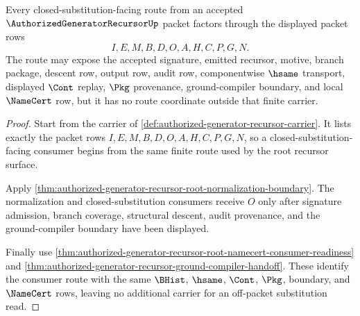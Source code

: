 \begin{theorem}
\label{thm:authorized-generator-recursor-root-carrier-route}
Every closed-substitution-facing route from an accepted $\AuthorizedGeneratorRecursorUp$ packet factors through the displayed packet rows
$$
I,E,M,B,D,O,A,H,C,P,G,N.
$$
The route may expose the accepted signature, emitted recursor, motive, branch package, descent row, output row, audit row, componentwise $\hsame$ transport, displayed $\Cont$ replay, $\Pkg$ provenance, ground-compiler boundary, and local $\NameCert$ row, but it has no route coordinate outside that finite carrier.
\end{theorem}
\begin{proof}
Start from the carrier of \autoref{def:authorized-generator-recursor-carrier}. It lists exactly the packet rows $I,E,M,B,D,O,A,H,C,P,G,N$, so a closed-substitution-facing consumer begins from the same finite route used by the root recursor surface.

Apply \autoref{thm:authorized-generator-recursor-root-normalization-boundary}. The normalization and closed-substitution consumers receive $O$ only after signature admission, branch coverage, structural descent, audit provenance, and the ground-compiler boundary have been displayed.

Finally use \autoref{thm:authorized-generator-recursor-root-namecert-consumer-readiness} and \autoref{thm:authorized-generator-recursor-ground-compiler-handoff}. These identify the consumer route with the same $\BHist$, $\hsame$, $\Cont$, $\Pkg$, boundary, and $\NameCert$ rows, leaving no additional carrier for an off-packet substitution read.
\end{proof}

